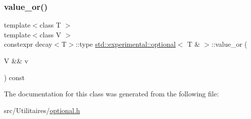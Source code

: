 \subsubsection{\texorpdfstring{value\+\_\+or()}{value\_or()}}
{\footnotesize\ttfamily template$<$class T $>$ \\
template$<$class V $>$ \\
constexpr decay$<$T$>$\+::type \mbox{\hyperlink{classstd_1_1experimental_1_1optional}{std\+::experimental\+::optional}}$<$ T \& $>$\+::value\+\_\+or (\begin{DoxyParamCaption}\item[{V \&\&}]{v }\end{DoxyParamCaption}) const\hspace{0.3cm}{\ttfamily [inline]}}



The documentation for this class was generated from the following file\+:\begin{DoxyCompactItemize}
\item 
src/\+Utilitaires/\mbox{\hyperlink{optional_8h}{optional.\+h}}\end{DoxyCompactItemize}
